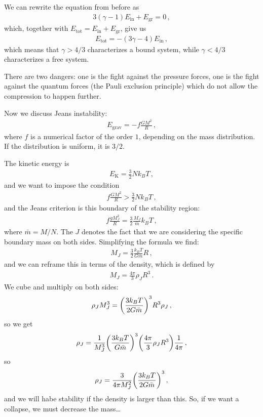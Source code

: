 \documentclass[main.tex]{subfiles}
\begin{document}
We can rewrite the equation from before as 
%
\begin{align}
  3(\gamma -1 ) E _{\text{in}} + E _{\text{gr}} = 0
\,,
\end{align}
%
which, together with \(E _{\text{tot}} = E _{\text{in}} + E _{\text{gr}}\), give us 
%
\begin{align}
  E _{\text{tot}} = - (3 \gamma - 4) E _{\text{in}}
\,,
\end{align}
%
which means that \(\gamma > 4/3\) characterizes a bound system, while \(\gamma < 4/3\) characterizes a free system. 

There are two dangers: one is the fight against the pressure forces, one is the fight against the quantum forces (the Pauli exclusion principle) which do not allow the compression to happen further. 

Now we discuss Jeans instability: 
%
\begin{align}
  E _{\text{grav}} = - f \frac{GM^2}{R}
\,,
\end{align}
%
where \(f\) is a numerical factor of the order \(1\), depending on the mass distribution. If the distribution is uniform, it is \(3/2\).

The kinetic energy is 
%
\begin{align}
  E _{\text{K}} = \frac{3}{2} N k_B T
\,,
\end{align}
%
and we want to impose the condition 
%
\begin{align}
  f \frac{GM^2}{R} > \frac{3}{2} N k_B T 
\,,
\end{align}
%
and the Jeans criterion is this boundary of the stability region: 
%
\begin{align}
  f \frac{gM_J^2}{R} = \frac{3}{2} \frac{M_J}{\bar{m}} k_B T
\,,
\end{align}
%
where \(\bar{m} = M / N\). 
The \(J\) denotes the fact that we are considering the specific boundary mass on both sides. Simplifying the formula we find: 
%
\begin{align}
  M_J = \frac{3}{2} \frac{k_B T }{G \bar{m}} R
\,,
\end{align}
%
and we can reframe this in terms of the density, which is defined by 
%
\begin{align}
  M_J = \frac{4 \pi }{3} \rho _J R^3
\,.
\end{align}
%
We cube and multiply on both sides: 
%
\begin{align}
  \rho_J M_J^3 = \qty(\frac{3 k_B T}{2 G \bar{m}})^3R^3 \rho_J
\,,
\end{align}
%
so we get 
%
\begin{align}
  \rho_J = \frac{1}{M_J^3} \qty(\frac{3 k_B T}{G \bar{m}})^3 \qty( \frac{4 \pi }{3} \rho_J R^3) \frac{1}{4 \pi }
\,,
\end{align}
%
so 
%
\begin{align}
  \rho _J = \frac{3}{4 \pi M_J^2} \qty(\frac{3 k_B T}{2 G \bar{m}})^3
\,,
\end{align}
%
and we will habe stability if the density is larger than this. So, if we want a collapse, we must decrease the mass\dots
\end{document}
